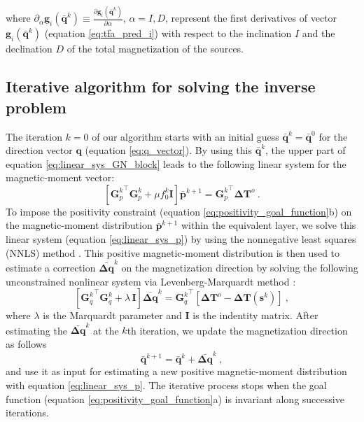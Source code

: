 where 
$\partial_{\alpha} \mathbf{g}_{i}(\bar{\mathbf{q}}^{k}) \equiv 
\frac{\partial \mathbf{g}_{i}(\bar{\mathbf{q}}^{k})}{\partial \alpha}$, $\alpha= I, D$, 
represent the first derivatives of vector 
$\mathbf{g}_{i}(\bar{\mathbf{q}}^{k})$ (equation \ref{eq:tfa_pred_i}) with respect to the 
inclination $I$ and the declination $D$ of the total magnetization of the sources.

\subsection{Iterative algorithm for solving the inverse problem}

The iteration $k = 0$ of our algorithm starts with an initial guess 
$\bar{\mathbf{q}}^{k} = \bar{\mathbf{q}}^{0}$ for the direction vector $\mathbf{q}$ 
(equation \ref{eq:q_vector}).
By using this $\bar{\mathbf{q}}^{k}$, the upper part of equation 
\ref{eq:linear_sys_GN_block} leads to the following linear system for the magnetic-moment 
vector:
\begin{equation}
\left[ {\mathbf{G}_{p}^{k}}^{\top} \mathbf{G}_{p}^{k} + 
\mu f_{0}^{k} \mathbf{I} \right] \bar{\mathbf{p}}^{k+1} = {\mathbf{G}_{p}^{k}}^{\top} \mathbf{\Delta T}^{o} \: .
\label{eq:linear_sys_p}
\end{equation}
To impose the positivity constraint (equation \ref{eq:positivity_goal_function}b) on the 
magnetic-moment distribution $\bar{\mathbf{p}}^{k+1}$ within the equivalent layer, 
we solve this linear system (equation \ref{eq:linear_sys_p}) by using the nonnegative least 
squares (NNLS) method \citep{lawson_hanson_1974}.
This positive magnetic-moment distribution is then used to estimate a correction 
$\bar{\mathbf{\Delta q}}^{k}$ on the magnetization direction by solving the following 
unconstrained nonlinear system via Levenberg-Marquardt method \citep{aster2005}:
\begin{equation}
\left[ {\mathbf{G}_{q}^{k}}^{\top} \mathbf{G}_{q}^{k} + \lambda \, \mathbf{I} \right] \bar{\mathbf{\Delta q}}^{k} = {\mathbf{G}_{q}^{k}}^{\top} 
\left[ \mathbf{\Delta T}^{o} - \mathbf{\Delta T} (\mathbf{s}^{k}) \right] \: ,
\label{eq:linear_sys_q}
\end{equation}
where $\lambda$ is the Marquardt parameter and $\mathbf{I}$ is the indentity matrix. 
After estimating the $\bar{\mathbf{\Delta q}}^{k}$ 
at the $k$th iteration, we update the magnetization direction as follows
\begin{equation}
\bar{\mathbf{q}}^{k+1} = \bar{\mathbf{q}}^{k} + \bar{\mathbf{\Delta q}}^{k} \: ,
\label{eq:q_next}
\end{equation}
and use it as input for estimating a new positive magnetic-moment distribution 
with equation \ref{eq:linear_sys_p}.
The iterative process stops when the goal function (equation \ref{eq:positivity_goal_function}a) 
is invariant along successive iterations. 

